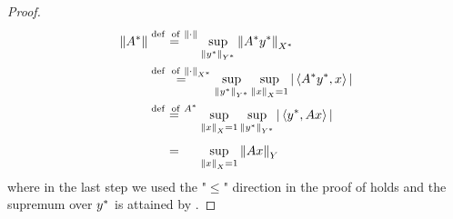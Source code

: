 \documentclass{article}
\begin{document}
\begin{proof}
\begin{align*}
    \norm{\dual{A}} &\stackrel{\textrm{def \ of} \ \norm{\cdot}}{=} \sup_{\norm{\dual{y}}_{\dual{Y}}} \norm{\dual{A} \dual{y}}_{\dual{X}} \\
    &\stackrel{\textrm{def \ of} \  \norm{\cdot}_{\dual{X}}}{=} \sup_{\norm{\dual{y}}_{\dual{Y}}} \sup_{\norm{x}_X=1} |\inne{\dual{A}\dual{y}}{x}| \\
    &\stackrel{\textrm{def \ of} \ \dual{A}}{=} \sup_{\norm{x}_X=1}  \sup_{\norm{\dual{y}}_{\dual{Y}}}  |\inne{\dual{y}}{Ax}| \\
    &\stackrel{\phantom{\textrm{def \ of} \ \dual{A}}}{=} \sup_{\norm{x}_X=1} \norm{Ax}_Y
\end{align*}
where in the last step we used the "$\leq$" direction in the proof of  holds and the supremum over ${y}^*$ is attained by .  
\end{proof}
\end{document}
